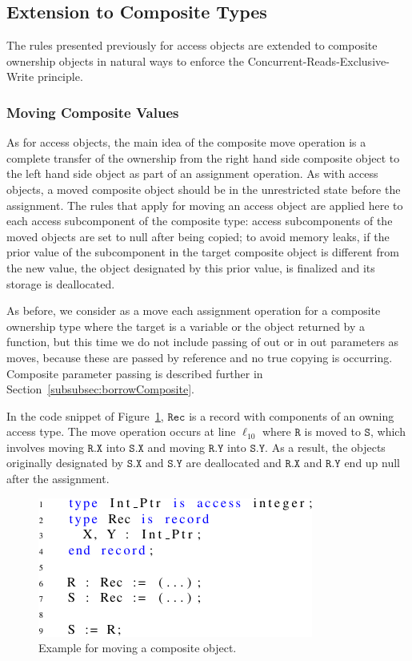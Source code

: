 \documentclass{llncs}
\newcommand\var[1]{\ensuremath{\mathtt{#1}}}
\newcommand{\keyword}[1]{\textsf{#1}}
\begin{document}
\subsection{Extension to Composite Types} 
\label{subsec:ownershipComposite}

The rules presented previously for access objects are extended to composite ownership objects in natural ways to enforce the Concurrent-Reads-Exclusive-Write principle. 

\subsubsection{Moving Composite Values}
\label{subsubsec:movingComposite}

As for access objects, the main idea of the composite move operation is a complete transfer of the ownership from the right hand side composite object to the left hand
side object as part of an assignment operation. As with access objects, a moved composite object should be in the unrestricted state before the assignment. The rules that apply for moving an
access object are applied here to each access subcomponent of the composite type: access subcomponents of the moved objects are set to null after being copied; to avoid memory leaks, if the
prior value of the subcomponent in the target composite object is different from the new value, the object designated by this prior value, is finalized and its storage is deallocated.  

As before, we consider as a move each assignment operation for a composite ownership type where the target is a variable or the object returned by a function, but this time we do not
include passing of \keyword{out} or \keyword{in out} parameters as moves, because these are passed by reference and no true copying is occurring. Composite parameter passing is described further in Section~\ref{subsubsec:borrowComposite}.

In the code snippet of Figure~\ref{fig:movingComposite}, \var{Rec} is a record with components of an owning access type. The move operation occurs at line $\ell_{10}$ where \var{R} is moved
to \var{S}, which involves moving \var{R.X} into \var{S.X} and moving \var{R.Y} into \var{S.Y}. As a result, the objects originally designated by
\var{S.X} and \var{S.Y} are deallocated and \var{R.X} and \var{R.Y} end up null after the assignment. 


\begin{figure}[htb!]
\centering
   \includegraphics[]{movingComposite}
   \caption{Example for moving a composite object.}
   \label{fig:movingComposite}
\end{figure}
 
\end{document}
